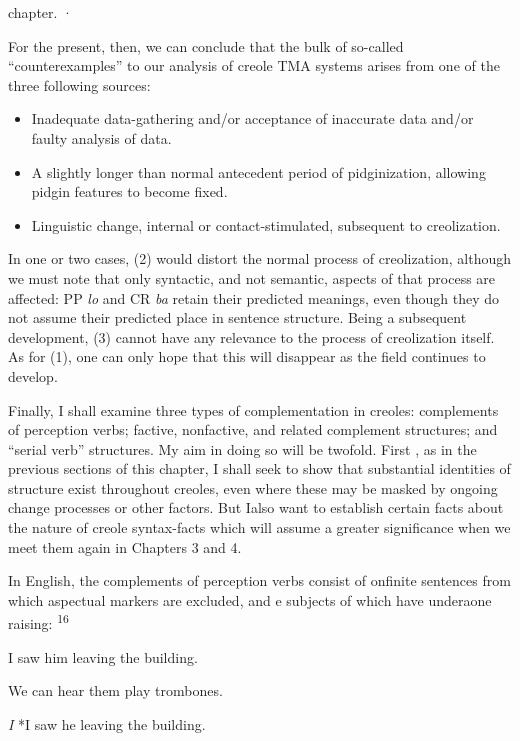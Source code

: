 chapter. ·

For the present, then, we can conclude that the bulk of so-called
``counterexamples'' to our analysis of creole TMA systems arises from one of the three following sources:

\begin{itemize}
\item Inadequate data-gathering and/or acceptance of inaccurate data and/or faulty analysis of data.
\item A slightly longer than normal antecedent period of pidginization, allowing pidgin features to become fixed.
\item Linguistic change, internal or contact-stimulated, subsequent to creolization.
\end{itemize}

In one or two cases, (2) would distort the normal process of creoliza\-tion, although we must note that only syntactic, and not semantic, aspects of that process are affected: PP \textit{lo} and CR \textit{ba} retain their predicted meanings, even though they do not assume their predicted place in sentence structure. Being a subsequent development, (3) cannot have any relevance to the process of creolization itself. As for (1), one can only hope that this will disappear as the field continues to develop.

Finally, I shall examine three types of complementation in creoles: complements of perception verbs; factive, nonfactive, and related complement structures; and ``serial verb'' structures. My aim in doing so will be twofold. First , as in the previous sections of this chapter, I shall seek to show that substantial identities of structure exist throughout creoles, even where these may be masked by ongoing change processes or other factors. But Ialso want to establish certain facts about the nature of creole syntax-facts which will assume a greater significance when we meet them again in Chapters 3 and 4.

In English, the complements of perception verbs consist of onfinite sentences from which aspectual markers are excluded, and e subjects of which have underaone raising: \textsuperscript{1}\textsuperscript{6}

\ea\label{ex:125}
 I saw him leaving the building.
\glt
\z

\ea\label{ex:126}
We can hear them play trombones.
\z

\ea\label{ex:127}
\textit{I} *I saw he leaving the building.
\z

